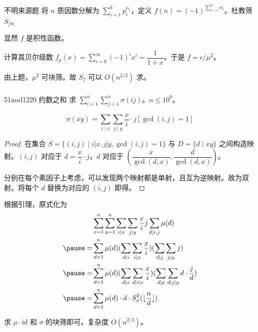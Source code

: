 \documentclass[../main.tex]{subfiles}
\begin{document}
\subsubsection{}

\begin{frame}{不明来源题}
将 $n$ 质因数分解为 $\sum\limits_{i=1}^kp_i^{\alpha_i}$，定义 $f(n)=(-1)^{\sum_{i=1}^k\alpha_i}$。杜教筛 $S_f$。\pause
\bigskip

显然 $f$ 是积性函数。

计算其贝尔级数 $f_p(x)=\sum\limits_{i=0}^{\infty}(-1)^ix^i=\dfrac{1}{1+x}$。于是 $f=\epsilon/\mu^2$。\pause

由上题，$\mu^2$ 可块筛。故 $S_f$ 可以 $O(n^{2/3})$ 求。
\end{frame}

\subsubsection{}

\begin{frame}{51nod1220 约数之和}
求 $\sum\limits_{i=1}^n\sum\limits_{j=1}^n\sigma(ij)$。$n\le 10^9$。
\end{frame}

\begin{frame}
\begin{theo}
$$
\sigma(xy)=\sum_{i\mid x}\sum_{j\mid y}\frac{x}{i}\cdot j[\gcd(i,j)=1]
$$
\end{theo}\pause

\begin{proof}
在集合 $S=\{(i,j)\mid i|x,j| y,\gcd(i,j)=1 \}$ 与 $D=\{d\mid xy\}$ 之间构造映射。$(i,j)$ 对应于 $d=\dfrac{x}{i}\cdot j$，$d$ 对应于 $(\dfrac{x}{\gcd(d,x)},\dfrac{d}{\gcd(d,x)})$。\pause

分别在每个素因子上考虑，可以发现两个映射都是单射，且互为逆映射。故为双射。将每个 $d$ 替换为对应的 $(i,j)$ 即得。
\end{proof}
\end{frame}

\begin{frame}
根据引理，原式化为
$$
\begin{aligned}
&\sum_{x=1}^n\sum_{y=1}^n\sum_{i\mid x}\sum_{j\mid y}\frac{x}{i}j\sum_{d\mid i,j}\mu(d)\\ \pause
=&\sum_{d=1}^n\mu(d)(\sum_{d\mid i}\sum_{i\mid x}\frac{x}{i})(\sum_{d\mid j}\sum_{j\mid y}j)\\ \pause
=&\sum_{d=1}^n\mu(d)(\sum_{d\mid x}\sum_{d\mid i\mid x}\frac{x}{i})(\sum_{d\mid y}\sum_{d\mid j\mid y}d\cdot\frac{j}{d})\\ \pause
=&\sum_{d=1}^n\mu(d)\cdot d\cdot S_{\sigma}^2(\lfloor\frac{n}{d}\rfloor)
\end{aligned}
$$ \pause

求 $\mu\cdot \text{id}$ 和 $\sigma$ 的块筛即可。复杂度 $O(n^{2/3})$。
\end{frame}
\end{document}
